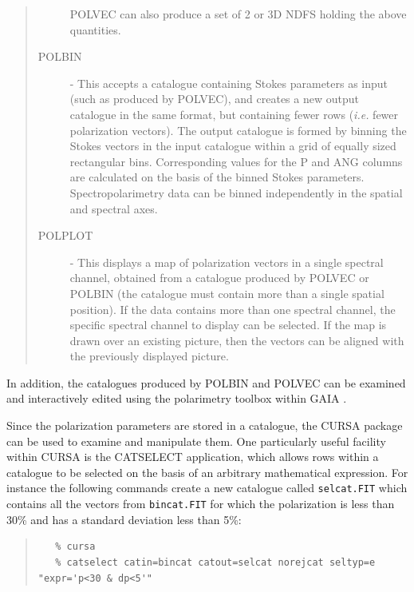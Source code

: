 \documentclass[twoside,11pt]{article}
\newcommand{\htmlref}[2]{#1}
\newcommand{\xref}[3]{#1}
\renewcommand{\_}{\texttt{\symbol{95}}}
\newenvironment{myquote}{\begin{quote}\begin{small}}{\end{small}\end{quote}}
\begin{document}
\begin{quote}
\begin{description}
POLVEC can also produce a set of 2 or 3D NDFS holding the above quantities.

\item [\htmlref{POLBIN}{POLBIN}] - This accepts a catalogue containing Stokes
parameters as input (such as produced by POLVEC), and creates a new
output catalogue in the same format, but containing fewer rows (\emph{i.e.}
fewer polarization vectors). The output catalogue is formed by binning the
Stokes vectors in the input catalogue within a grid of equally sized
rectangular bins. Corresponding values for the P and ANG columns are
calculated on the basis of the binned Stokes parameters.
Spectropolarimetry data can be binned independently in the spatial and
spectral axes.

\item [\htmlref{POLPLOT}{POLPLOT}] - This displays a map of polarization 
vectors in a single spectral channel, obtained from a catalogue produced
by POLVEC or POLBIN (the catalogue must contain more than a single
spatial position). If the data contains more than one spectral channel,
the specific spectral channel to display can be selected. If the map is
drawn over an existing picture, then the vectors can be aligned with the
previously displayed picture.

\end{description}
\end{quote}

In addition, the catalogues produced by POLBIN and POLVEC can be examined
and interactively edited using the polarimetry toolbox within 
\xref{GAIA}{sun214}{} .

Since the polarization parameters are stored in a catalogue, the
\xref{CURSA}{sun190}{} package  can be used to
examine and manipulate them. One particularly useful facility within
CURSA is the \xref{CATSELECT}{sun190}{SELECT} application, which
allows rows within a catalogue to be selected on the basis of an
arbitrary mathematical expression. For instance the following commands
create a new catalogue called \verb+selcat.FIT+ which contains all the
vectors from \verb+bincat.FIT+ for which the polarization is less than
30\% and has a standard deviation less than 5\%:

\begin{myquote}
\begin{verbatim}
   % cursa
   % catselect catin=bincat catout=selcat norejcat seltyp=e "expr='p<30 & dp<5'"
\end{verbatim}
\end{myquote}
\end{document}
